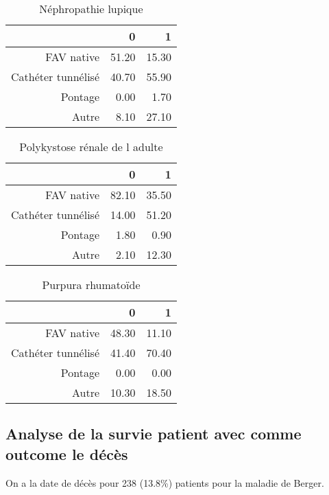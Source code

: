 \documentclass[11pt,a4paper]{article}\usepackage[]{graphicx}\usepackage[]{color}
\begin{document}
\begin{multicols}{2}
\begin{table}[H]
\centering
\begin{tabular}{rrr}
  \hline
 & 0 & 1 \\ 
  \hline
FAV native & 51.20 & 15.30 \\ 
  Cathéter tunnélisé & 40.70 & 55.90 \\ 
  Pontage & 0.00 & 1.70 \\ 
  Autre & 8.10 & 27.10 \\ 
   \hline
\end{tabular}
\caption{Néphropathie lupique} 
\end{table}
\begin{table}[H]
\centering
\begin{tabular}{rrr}
  \hline
 & 0 & 1 \\ 
  \hline
FAV native & 82.10 & 35.50 \\ 
  Cathéter tunnélisé & 14.00 & 51.20 \\ 
  Pontage & 1.80 & 0.90 \\ 
  Autre & 2.10 & 12.30 \\ 
   \hline
\end{tabular}
\caption{Polykystose rénale de l adulte} 
\end{table}
\begin{table}[H]
\centering
\begin{tabular}{rrr}
  \hline
 & 0 & 1 \\ 
  \hline
FAV native & 48.30 & 11.10 \\ 
  Cathéter tunnélisé & 41.40 & 70.40 \\ 
  Pontage & 0.00 & 0.00 \\ 
  Autre & 10.30 & 18.50 \\ 
   \hline
\end{tabular}
\caption{Purpura rhumatoïde} 
\end{table}

\end{multicols}

  \subsection{Analyse de la survie patient avec comme outcome le décès}
  
  On a la date de décès pour 238 (13.8\%) patients pour la maladie de Berger.
  
\end{document}
